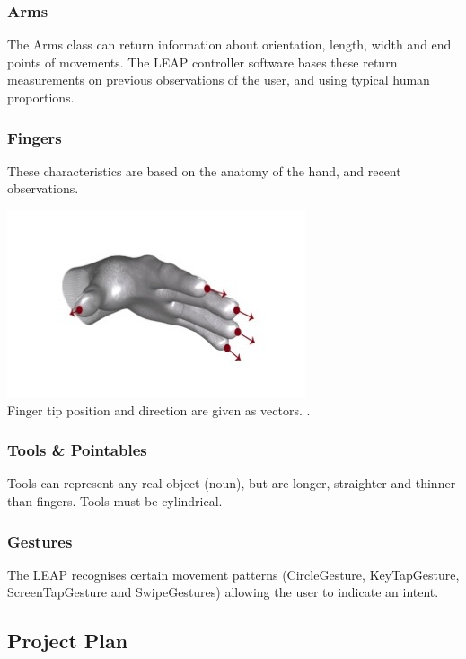 \documentclass[a4paper, 10pt]{article}
\begin{document}
\subsubsection{Arms}
The Arms class can return information about orientation, length, width and end points of movements. The LEAP controller software bases these return measurements on previous observations of the user, and using typical human proportions.

\subsubsection{Fingers}
These characteristics are based on the anatomy of the hand, and recent observations. 

\begin{center}
\includegraphics[scale=0.4]{fingers}\\
Finger tip position and direction are given as vectors. \cite{leap}.
\end{center}


\subsubsection{Tools \& Pointables}
Tools can represent any real object (noun), but are longer, straighter and thinner than fingers. Tools must be cylindrical.

\subsubsection{Gestures}
The LEAP recognises certain movement patterns (CircleGesture, KeyTapGesture, ScreenTapGesture and SwipeGestures) allowing the user to indicate an intent.


\subsection{Project Plan}\label{plan}
\end{document}
